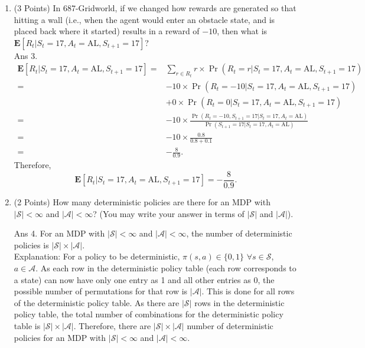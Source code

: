 \documentclass[]{article}
\begin{document}
\begin{enumerate}
    \item (3 Points) In 687-Gridworld, if we changed how rewards are generated so that hitting a wall (i.e., when the agent would enter an obstacle state, and is placed back where it started) results in a reward of $-10$, then what is $\mathbf{E}[R_t|S_t=17,A_t=\text{AL}, S_{t+1}=17]$?
    \\
	
	{
		\color{blue}
		Ans 3. \begin{align}
		            \mathbf{E}[R_t|S_t=17,A_t=\text{AL}, S_{t+1}=17] =& \sum_{r \in R_t} r \times \Pr(R_t=r|S_t=17,A_t=\text{AL},S_{t+1}=17) \\
		            =& -10 \times \Pr(R_t=-10|S_t=17,A_t=\text{AL},S_{t+1}=17) \\
			& + 0 \times  \Pr(R_t=0|S_t=17,A_t=\text{AL},S_{t+1}=17)\\
		           =& -10 \times \frac{\Pr(R_t=-10,S_{t+1}=17|S_t=17,A_t=\text{AL})}{\Pr(S_{t+1}=17|S_t=17,A_t=\text{AL})}\\
		            =& -10 \times \frac{0.8}{0.8+0.1}\\
		            =& -\frac{8}{0.9}.
		        \end{align}
		        Therefore,
		        \begin{equation}
		            \mathbf{E}[R_t|S_t=17,A_t=\text{AL}, S_{t+1}=17]=-\frac{8}{0.9}.
		        \end{equation}
	}

	
    
    \item (2 Points) How many deterministic policies are there for an MDP with $|\mathcal S|< \infty$ and $|\mathcal A|<\infty$? (You may write your answer in terms of $|\mathcal S|$ and $|\mathcal A|$).

	{
		\color{blue}
			Ans 4. For an MDP with $|\mathcal S|< \infty$ and $|\mathcal A|<\infty$, the number of deterministic policies is $|\mathcal S| \times |\mathcal A|$.
			\\
			Explanation: For a policy to be deterministic, $\pi(s, a) \in \{0, 1\}$ $\forall s \in \mathcal S$, $a \in \mathcal A$. As each row in the deterministic policy table (each row corresponds to a state) can now have only one entry as 1 and all other entries as 0, the possible number of permutations for that row is $|\mathcal A|$. This is done for all rows of the deterministic policy table. As there are $|\mathcal S|$ rows in the deterministic policy table, the total number of combinations for the deterministic policy table is $|\mathcal S| \times |\mathcal A|$. Therefore, there are $|\mathcal S| \times |\mathcal A|$ number of deterministic policies for an MDP with $|\mathcal S|< \infty$ and $|\mathcal A|<\infty$.
	}
    

\end{enumerate}
\end{document}
